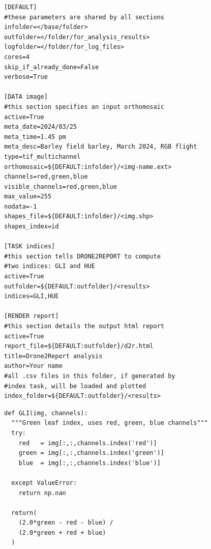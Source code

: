 \documentclass[drones,technicalnote,accept,pdftex,moreauthors]{Definitions/mdpi}
\begin{document}
\begin{minipage}{\hsize}%
\lstset{frame=single,framexleftmargin=-1pt,framexrightmargin=-17pt,framesep=12pt,linewidth=0.98\textwidth,language=bash}%
\begin{lstlisting}[caption={Example of configuration file to run \textsc{drone2report}.
This takes the form of a standard .ini file, divided in sections (between
square brackets) and supporting comments (using the hash symbol}, label={lst:config}]
[DEFAULT]
#these parameters are shared by all sections
infolder=</base/folder>
outfolder=</folder/for_analysis_results>
logfolder=</folder/for_log_files>
cores=4
skip_if_already_done=False
verbose=True

[DATA image]
#this section specifies an input orthomosaic
active=True
meta_date=2024/03/25
meta_time=1.45 pm
meta_desc=Barley field barley, March 2024, RGB flight
type=tif_multichannel
orthomosaic=${DEFAULT:infolder}/<img-name.ext>
channels=red,green,blue
visible_channels=red,green,blue
max_value=255 
nodata=-1
shapes_file=${DEFAULT:infolder}/<img.shp>
shapes_index=id

[TASK indices]
#this section tells DRONE2REPORT to compute 
#two indices: GLI and HUE
active=True
outfolder=${DEFAULT:outfolder}/<results>
indices=GLI,HUE

[RENDER report]
#this section details the output html report
active=True
report_file=${DEFAULT:outfolder}/d2r.html
title=Drone2Report analysis
author=Your name
#all .csv files in this folder, if generated by
#index task, will be loaded and plotted
index_folder=${DEFAULT:outfolder}/<results>

\end{lstlisting}
\end{minipage}

\begin{minipage}{\hsize}%
\lstset{frame=single,framexleftmargin=-1pt,framexrightmargin=-17pt,framesep=12pt,linewidth=0.98\textwidth,language=python}%

\begin{lstlisting}[caption={Example of function computing the GLI vegetation index on a passed image},label={lst:GLI_function}]
def GLI(img, channels):
  """Green leaf index, uses red, green, blue channels"""
  try:
    red   = img[:,:,channels.index('red')]
    green = img[:,:,channels.index('green')]
    blue  = img[:,:,channels.index('blue')]
   
  except ValueError:
    return np.nan
    
  return(
    (2.0*green - red - blue) / 
    (2.0*green + red + blue)
  ) 
\end{lstlisting}
\end{minipage}
\end{document}
